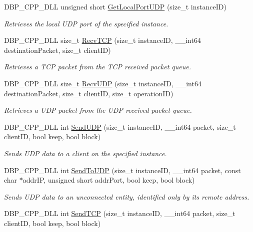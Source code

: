 \begin{DoxyCompactItemize}
DBP\_\-CPP\_\-DLL unsigned short \hyperlink{namespacemn_a8172bc9d62d2d54dae57340a052c1575}{GetLocalPortUDP} (size\_\-t instanceID)
\begin{DoxyCompactList}\small\item\em Retrieves the local UDP port of the specified instance. \item\end{DoxyCompactList}\item 
DBP\_\-CPP\_\-DLL size\_\-t \hyperlink{namespacemn_adfe8471ae07cd596fe9215a890faac69}{RecvTCP} (size\_\-t instanceID, \_\-\_\-int64 destinationPacket, size\_\-t clientID)
\begin{DoxyCompactList}\small\item\em Retrieves a TCP packet from the TCP received packet queue. \item\end{DoxyCompactList}\item 
DBP\_\-CPP\_\-DLL size\_\-t \hyperlink{namespacemn_a62627020941d9c6cdd1e3e3d1919c28b}{RecvUDP} (size\_\-t instanceID, \_\-\_\-int64 destinationPacket, size\_\-t clientID, size\_\-t operationID)
\begin{DoxyCompactList}\small\item\em Retrieves a UDP packet from the UDP received packet queue. \item\end{DoxyCompactList}\item 
DBP\_\-CPP\_\-DLL int \hyperlink{namespacemn_af9ce5db9b08f558c31f581c791ae422c}{SendUDP} (size\_\-t instanceID, \_\-\_\-int64 packet, size\_\-t clientID, bool keep, bool block)
\begin{DoxyCompactList}\small\item\em Sends UDP data to a client on the specified instance. \item\end{DoxyCompactList}\item 
DBP\_\-CPP\_\-DLL int \hyperlink{namespacemn_a4576cc65008a1552f1185340b7c3e581}{SendToUDP} (size\_\-t instanceID, \_\-\_\-int64 packet, const char $\ast$addrIP, unsigned short addrPort, bool keep, bool block)
\begin{DoxyCompactList}\small\item\em Sends UDP data to an unconnected entity, identified only by its remote address. \item\end{DoxyCompactList}\item 
DBP\_\-CPP\_\-DLL int \hyperlink{namespacemn_a6f052556b3373d7c8b39f8c93514850d}{SendTCP} (size\_\-t instanceID, \_\-\_\-int64 packet, size\_\-t clientID, bool keep, bool block)

\end{DoxyCompactItemize}
